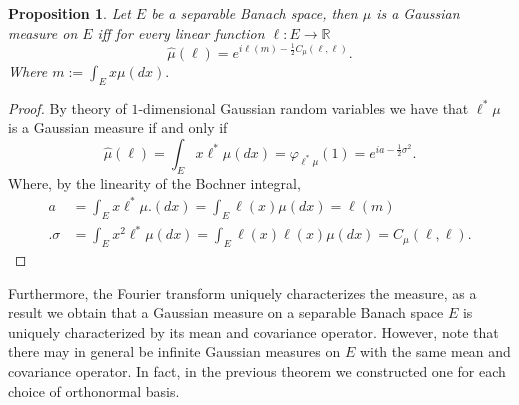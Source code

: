 \documentclass[12pt]{article}
\newcommand{\R}{{\mathbb R}}
\newtheorem{proposition}{Proposition}
\begin{document}
\begin{proposition}
	Let $E$ be a separable Banach space, then $\mu $ is a Gaussian measure on $E$ iff for every linear function  $\ell :E\to\R$
	\begin{equation*}
		\hat{\mu }(\ell )=e^{i\ell(m)-\frac{1}{2}C_\mu (\ell ,\ell )}.
	\end{equation*}
	Where
	$		m:=\int_{E}x \mu (dx).
	$
\end{proposition}
\begin{proof}
	By theory of $1$-dimensional Gaussian random variables we have that  $\ell ^*\mu $
	is a Gaussian measure if and only if
	\begin{equation*}
		\hat{\mu }(\ell )=\int_{E}x \ell^*\mu (dx)=\varphi_{\ell^*\mu}(1)=e^{ia -\frac{1}{2}\sigma^2} .
	\end{equation*}
	Where, by the linearity of the Bochner integral,
	\begin{align*}
		a      & =\int_{E}x \ell ^*\mu.  (dx)=\int_{E}\ell(x)\mu(dx)=\ell(m)                      \\ .
		\sigma & =\int_{E}x^2 \ell ^*\mu  (dx)=\int_{E}\ell(x)\ell (x)\mu(dx)=C_\mu (\ell ,\ell).
	\end{align*}
\end{proof}
Furthermore, the Fourier transform uniquely characterizes the measure, as a result we obtain that a Gaussian measure on  a separable Banach space $E$ is uniquely characterized by its mean and covariance operator. However, note that  there may in general be infinite Gaussian measures on $E$ with the same mean and covariance operator. In fact, in the previous theorem we constructed one for each choice of orthonormal basis.
\end{document}
